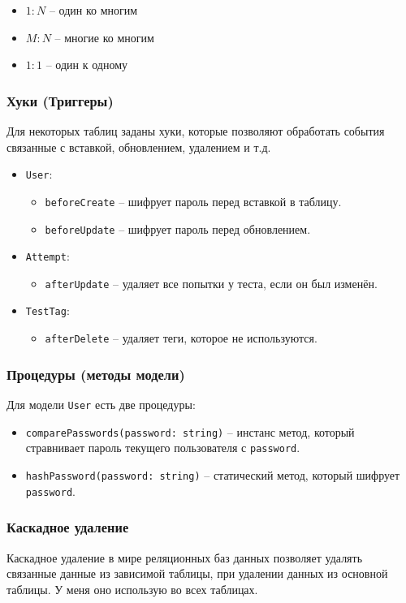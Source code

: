 \begin{itemize}
    \item $1:N$ -- один ко многим
    \item $M:N$ -- многие ко многим
    \item $1:1$ -- один к одному
\end{itemize}

\subsubsection{Хуки (Триггеры)}
Для некоторых таблиц заданы хуки, которые позволяют обработать события связанные с вставкой, обновлением, удалением и т.д.

\begin{itemize}
    \item \texttt{User}: \begin{itemize}
        \item \texttt{beforeCreate} -- шифрует пароль перед вставкой в таблицу.
        \item \texttt{beforeUpdate} -- шифрует пароль перед обновлением.
    \end{itemize}
    \item \texttt{Attempt}: \begin{itemize}
        \item \texttt{afterUpdate} -- удаляет все попытки у теста, если он был изменён.
    \end{itemize}
    \item \texttt{TestTag}: \begin{itemize}
        \item \texttt{afterDelete} -- удаляет теги, которое не используются.
    \end{itemize}
\end{itemize}

\subsubsection{Процедуры (методы модели)}
Для модели \texttt{User} есть две процедуры:
\begin{itemize}
    \item \texttt{comparePasswords(password: string)} -- инстанс метод, который стравнивает пароль текущего пользователя с \texttt{password}.
    \item \texttt{hashPassword(password: string)} -- статический метод, который шифрует \texttt{password}.
\end{itemize}

\subsubsection{Каскадное удаление}
Каскадное удаление в мире реляционных баз данных позволяет удалять связанные данные из зависимой таблицы, при удалении данных из основной таблицы. У меня оно использую во всех таблицах.

\clearpage